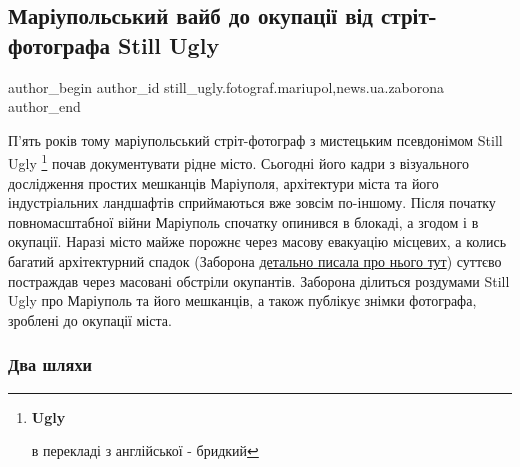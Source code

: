  
 
 
 
 
 
\subsection{Маріупольський вайб до окупації від стріт-фотографа Still Ugly}
\label{sec:07_04_2023.stz.news.ua.zaborona.1.mariupol_vajb_still_ugly}
 
\ifcmt
 author_begin
   author_id still_ugly.fotograf.mariupol,news.ua.zaborona
 author_end
\fi


\begin{qqquote}
П'ять років тому маріупольський стріт-фотограф з мистецьким псевдонімом Still
Ugly \footnote{\textbf{Ugly}\par в перекладі з англійської - бридкий} почав документувати рідне місто. Сьогодні його кадри з візуального
дослідження простих мешканців Маріуполя, архітектури міста та його
індустріальних ландшафтів сприймаються вже зовсім по-іншому. Після початку
повномасштабної війни Маріуполь спочатку опинився в блокаді, а згодом і в
окупації. Наразі місто майже порожнє через масову евакуацію місцевих, а колись
багатий архітектурний спадок (Заборона \href{https://zaborona.com/shho-vy-znayete-pro-arhitekturu-promyslovyh-mist-vona-prekrasna-os-yak-vyglyadayut-najczikavishi-budivli-mariupolya/}{детально писала про нього тут}) суттєво
постраждав через масовані обстріли окупантів. Заборона ділиться роздумами Still
Ugly про Маріуполь та його мешканців, а також публікує знімки фотографа,
зроблені до окупації міста.
\end{qqquote}

\subsubsection{Два шляхи}

